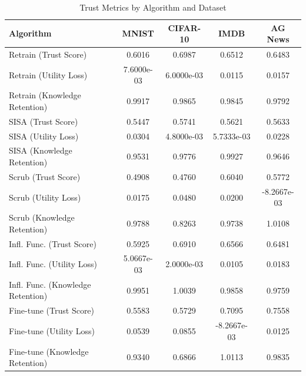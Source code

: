 \begin{table}[t]
\centering
\caption{Trust Metrics by Algorithm and Dataset}
\label{tab:trust_results}
\small
\begin{tabular}{lcccc}
\toprule
Algorithm & MNIST & CIFAR-10 & IMDB & AG News \\
\midrule
Retrain (Trust Score) & 0.6016 & 0.6987 & 0.6512 & 0.6483 \\
Retrain (Utility Loss) & 7.6000e-03 & 6.0000e-03 & 0.0115 & 0.0157 \\
Retrain (Knowledge Retention) & 0.9917 & 0.9865 & 0.9845 & 0.9792 \\
SISA (Trust Score) & 0.5447 & 0.5741 & 0.5621 & 0.5633 \\
SISA (Utility Loss) & 0.0304 & 4.8000e-03 & 5.7333e-03 & 0.0228 \\
SISA (Knowledge Retention) & 0.9531 & 0.9776 & 0.9927 & 0.9646 \\
Scrub (Trust Score) & 0.4908 & 0.4760 & 0.6040 & 0.5772 \\
Scrub (Utility Loss) & 0.0175 & 0.0480 & 0.0200 & -8.2667e-03 \\
Scrub (Knowledge Retention) & 0.9788 & 0.8263 & 0.9738 & 1.0108 \\
Infl. Func. (Trust Score) & 0.5925 & 0.6910 & 0.6566 & 0.6481 \\
Infl. Func. (Utility Loss) & 5.0667e-03 & 2.0000e-03 & 0.0105 & 0.0183 \\
Infl. Func. (Knowledge Retention) & 0.9951 & 1.0039 & 0.9858 & 0.9759 \\
Fine-tune (Trust Score) & 0.5583 & 0.5729 & 0.7095 & 0.7558 \\
Fine-tune (Utility Loss) & 0.0539 & 0.0855 & -8.2667e-03 & 0.0125 \\
Fine-tune (Knowledge Retention) & 0.9340 & 0.6866 & 1.0113 & 0.9835 \\
\bottomrule
\end{tabular}
\end{table}
